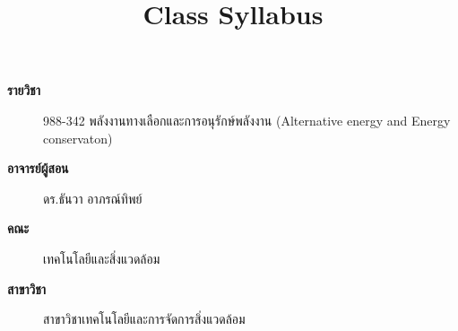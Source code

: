 \documentclass[a4paper,12pt]{article}
\begin{document}
\title{Class Syllabus\vspace{-2cm}}
\date{}
\maketitle

\begin{description}
    \item [\textbf{รายวิชา}] 988-342 พลังงานทางเลือกและการอนุรักษ์พลังงาน (Alternative energy and Energy conservaton)
    \item [\textbf{อาจารย์ผู้สอน}] ดร.ธันวา อาภรณ์ทิพย์
    \item [\textbf{คณะ}] เทคโนโลยีและสิ่งแวดล้อม
    \item [\textbf{สาขาวิชา}] สาขาวิชาเทคโนโลยีและการจัดการสิ่งแวดล้อม
\end{description}
\end{document}
